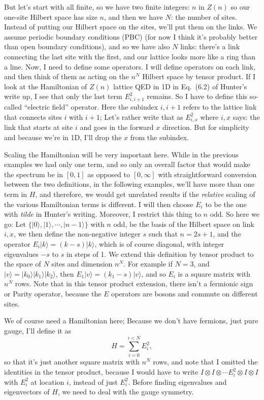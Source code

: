 	But let's start with all finite, so we have two finite integers: $n$ in $Z(n)$ so our one-site Hilbert space has size $n$, and then we have
	$N$: the number of sites. Instead of putting our Hilbert space on the sites, we'll put them on the links.
	We assume periodic boundary conditions (PBC) (for now I think it's probably better than open boundary conditions), and so we
	have also $N$ links: there's a link connecting the last site with the first, and our lattice looks more like a ring than a line.
	Now, I need to define some operators. I will define operators on each link, and then think of them as acting on the $n^N$ Hilbert space
	by tensor product. If I look at the Hamiltonian of $Z(n)$ lattice QED in 1D in Eq.~(6.2) of Hunter's write up, I see that only the last
	term $E^2_{i,i+1}$ remains. So I have to define this so-called ``electric field'' operator. Here the subindex $i,i+1$ refers to the lattice link that connects sites
	$i$ with $i+1$; Let's rather write that as $E^2_{i,x}$ where $i,x$ says: the link that starts at site $i$ and goes in the forward $x$ direction.
	But for simplicity and because we're in 1D, I'll drop the $x$ from the subindex.

	Scaling the Hamiltonian will be very important here. While in the previous examples we had only one term, and so only an overall
	factor that would make the spectrum be in $[0,1]$ as opposed to $[0,\infty]$ with straightforward conversion between the two
	definitions, in the following examples, we'll have more than one term in $H$, and therefore, we would get unrelated results
	if the \emph{relative} scaling of the various Hamiltonian terms is different. I will then choose $E_i$ to be the one with \emph{tilde} in
	Hunter's writing. Moreover, I restrict this thing to $n$ odd. So here we go: Let $\{|0\rangle, |1\rangle,\cdots,|n-1\rangle\}$ with $n$ odd,
	be the basis of the Hilbert space on link $i,x$, we then define
	the non-negative integer $s$ such that $n=2s+1$, and the operator
	$E_i|k\rangle=(k-s)|k\rangle$, which is of course diagonal, with integer eigenvalues $-s$ to $s$ in steps of 1.
	We extend this definition by tensor product
	to the space of $N$ sites and dimension $n^N$. For example if $N=3$, and $|v\rangle=|k_0\rangle|k_1\rangle|k_2\rangle$,
	then $E_1|v\rangle=(k_1-s)|v\rangle$, and so $E_i$ is a square matrix with $n^N$ rows. Note that in this tensor product extension, there isn't a
	fermionic sign or Parity operator, because the $E$ operators are bosons and commute on different sites.

	We of course need a Hamiltonian here; Because we don't have fermions, just pure gauge, I'll define it as
	\begin{equation}
	H=\sum_{i=0}^{i<N} E_i^2,
	\end{equation} so that it's just another square matrix with $n^N$ rows, and note that I omitted the identities in the tensor product,
	because I would have to write $I\otimes I\otimes\cdots E_i^2 \otimes I \otimes I$ with $E_i^2$ at location $i$, instead of just $E_i^2$.
	Before finding eigenvalues and eigenvectors of $H$, we need to deal with the gauge symmetry.

